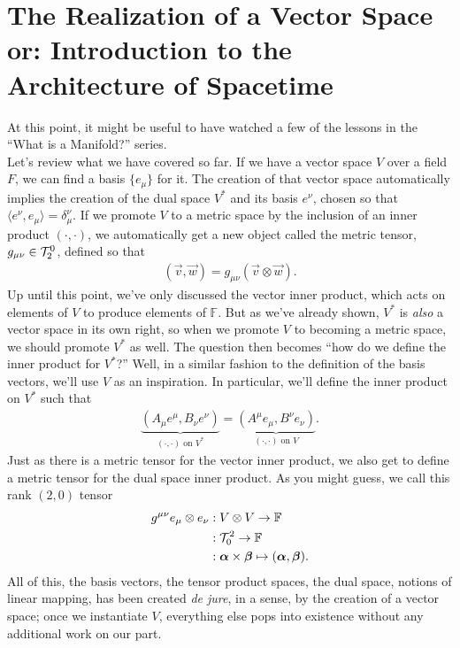 \chapter{The Realization of a Vector Space or: Introduction to the Architecture of Spacetime}
At this point, it might be useful to have watched a few of the lessons in the ``What is a Manifold?'' series.\\[1ex]

\noindent
Let's review what we have covered so far.
If we have a vector space $V$ over a field $F$, we can find a basis $\{e_\mu\}$ for it.
The creation of that vector space automatically implies the creation of the dual space $V^*$ and its basis $e^\nu$, chosen so that $\langle e^\nu, e_\mu \rangle = \delta^\nu_\mu$.
If we promote $V$ to a metric space by the inclusion of an inner product $(\cdot,\cdot)$, we automatically get a new object called the metric tensor, $g_{\mu\nu} \in \mathcal{T}^0_2$, defined so that
\begin{align*}
    (\vec{v},\vec{w}) = g_{\mu\nu}(\vec{v} \otimes \vec{w}).
\end{align*}
Up until this point, we've only discussed the vector inner product, which acts on elements of $V$ to produce elements of $\mathbb{F}$.
But as we've already shown, $V^*$ is \emph{also} a vector space in its own right, so when we promote $V$ to becoming a metric space, we should promote $V^*$ as well.
The question then becomes ``how do we define the inner product for $V^*$?''
Well, in a similar fashion to the definition of the basis vectors, we'll use $V$ as an inspiration.
In particular, we'll define the inner product on $V^*$ such that
\begin{align*}
    \underbrace{(A_\mu e^\mu, B_\nu e^\nu)}_{\text{$(\cdot, \cdot)$ on $V^*$}} = \underbrace{(A^\mu e_\mu, B^\nu e_\nu)}_{\text{$(\cdot, \cdot)$ on $V$}}.
\end{align*}
Just as there is a metric tensor for the vector inner product, we also get to define a metric tensor for the dual space inner product.
As you might guess, we call this rank $(2,0)$ tensor
\begin{align*}
    g^{\mu\nu} e_\mu \otimes e_\nu &: V \otimes V \to \mathbb{F} \\
               &: \mathcal{T}^2_0 \to \mathbb{F} \\
               &: \vb*{\alpha} \times \vb*{\beta} \mapsto (\vb*{\alpha},\vb*{\beta}).
\end{align*}
All of this, the basis vectors, the tensor product spaces, the dual space, notions of linear mapping, has been created \emph{de jure}, in a sense, by the creation of a vector space; once we instantiate $V$, everything else pops into existence without any additional work on our part.
